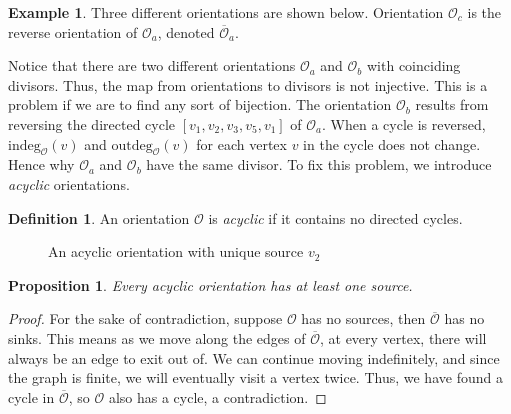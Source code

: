 \documentclass[openany, amssymb, psamsfonts]{amsart}
\newtheorem{prop}{Proposition}[section]
\theoremstyle{definition}
\newtheorem{defn}{Definition}[section]
\newtheorem{exmp}{Example}[section]
\numberwithin{equation}{section}
\begin{document}
\begin{exmp}
Three different orientations are shown below. Orientation $\mathcal{O}_c$ is the reverse orientation of $\mathcal{O}_a$, denoted $\overline{\mathcal{O}}_a$. 
\begin{center}
    
\end{center}
Notice that there are two different orientations $\mathcal{O}_a$ and $\mathcal{O}_b$ with coinciding divisors. Thus, the map from orientations to divisors is not injective. This is a problem if we are to find any sort of bijection. The orientation $\mathcal{O}_b$ results from reversing the directed cycle $[v_1,v_2,v_3,v_5,v_1]$ of $\mathcal{O}_a$. When a cycle is reversed, $\text{indeg}_{\mathcal{O}}(v)$ and $\text{outdeg}_{\mathcal{O}}(v)$ for each vertex $v$ in the cycle does not change. Hence why $\mathcal{O}_a$ and $\mathcal{O}_b$ have the same divisor. To fix this problem, we introduce \textit{acyclic} orientations.
\end{exmp}

\begin{defn}
\label{defn 7.4}
An orientation $\mathcal{O}$ is \textit{acyclic} if it contains no directed cycles.
\end{defn}

\begin{figure}[ht]
    \centering
    
    \caption{An acyclic orientation with unique source $v_2$}
    \label{fig 7.2}
\end{figure}

\begin{prop}
\label{prop 7.1}
Every acyclic orientation has at least one source.
\end{prop}
\begin{proof}
For the sake of contradiction, suppose $\mathcal{O}$ has no sources, then $\overline{\mathcal{O}}$ has no sinks. This means as we move along the edges of $\overline{\mathcal{O}}$, at every vertex, there will always be an edge to exit out of. We can continue moving indefinitely, and since the graph is finite, we will eventually visit a vertex twice. Thus, we have found a cycle in $\overline{\mathcal{O}}$, so $\mathcal{O}$ also has a cycle, a contradiction.
\end{proof}
\end{document}
